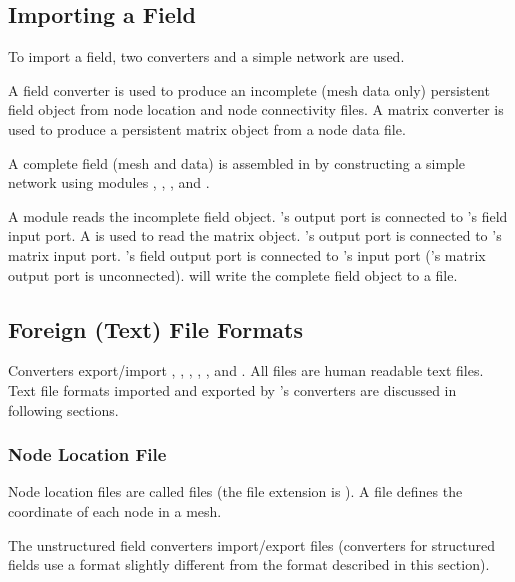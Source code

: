 \subsection{Importing a Field}
\label{sec:import_field}

To import a field, two converters and a simple \sr{} network are used.

A field converter is used to produce an incomplete (mesh data only)
persistent field object from node location and node connectivity
files.  A matrix converter is used to produce a persistent matrix
object from a node data file.

A complete field (mesh and data) is assembled in \sr{} by
constructing a simple network using modules ,
,  , and
.

A  module reads the incomplete field object.
's output port is connected to
's field input port.  A
 is used to read the matrix object.
's output port is connected to
's matrix input port.
's field output port is connected to
's input port ('s
matrix output port is unconnected).   will write
the complete field object to a file.

\subsection{Foreign (Text) File Formats}

Converters export/import , , , , ,  and .  All files are human readable text files.  Text file formats
imported and exported by \sr{}'s converters are discussed in following
sections.

\subsubsection{Node Location File}
\label{sec:node_loc_fmt}

Node location files are called  files (the file extension is
).  A  file defines the coordinate of
each node in a mesh.

The unstructured field converters import/export  files
(converters for structured fields use a  format slightly
different from the format described in this section).


